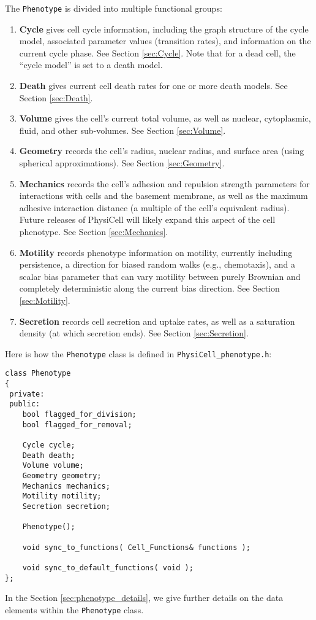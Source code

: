 \documentclass[12pt]{article}
\renewcommand{\v}{\verb}
\begin{document}
The \v|Phenotype| is divided into multiple functional groups: 
\begin{enumerate}
\item 
\textbf{Cycle} gives cell cycle information, including the graph structure of the 
cycle model, associated parameter values (transition rates), and information 
on the current cycle phase. See Section \ref{sec:Cycle}. 
Note that for a dead cell, the ``cycle model'' 
is set to a death model. 

\item 
\textbf{Death} gives current cell death rates for one or more 
death models. See Section \ref{sec:Death}. 

\item 
\textbf{Volume} gives the cell's current total volume, as well as nuclear, cytoplasmic, 
fluid, and other sub-volumes. See Section \ref{sec:Volume}.

\item 
\textbf{Geometry} records the cell's radius, nuclear radius, and surface area (using 
spherical approximations).  See Section \ref{sec:Geometry}.

\item
\textbf{Mechanics} records the cell's adhesion and repulsion strength parameters for 
interactions with cells and the basement membrane, as well as 
the maximum adhesive interaction distance (a multiple of the cell's equivalent radius). 
Future releases of PhysiCell will likely expand this aspect of the cell phenotype. 
See Section \ref{sec:Mechanics}.

\item
\textbf{Motility} records phenotype information on motility, currently including 
persistence, a direction for biased random walks (e.g., chemotaxis), and a 
scalar bias parameter that can vary motility between purely Brownian and 
completely deterministic along the current bias direction. See Section \ref{sec:Motility}. 

\item 
\textbf{Secretion} records cell secretion and uptake rates, as well as a 
saturation density (at which secretion ends). See Section \ref{sec:Secretion}. 
\end{enumerate}

Here is how the \v|Phenotype| class is defined in \v|PhysiCell_phenotype.h|:
\begin{verbatim}
class Phenotype
{
 private:
 public:
    bool flagged_for_division; 
    bool flagged_for_removal; 
 
    Cycle cycle; 
    Death death; 
    Volume volume; 
    Geometry geometry; 
    Mechanics mechanics; 
    Motility motility; 
    Secretion secretion; 
    
    Phenotype();   
    
    void sync_to_functions( Cell_Functions& functions ); 
    
    void sync_to_default_functions( void );   
};
\end{verbatim}
In the Section \ref{sec:phenotype_details}, we give further details on the data elements within the \v|Phenotype| class. 
\end{document}
